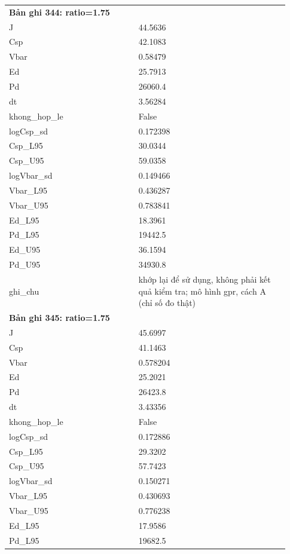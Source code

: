 \begin{longtable}{p{0.43\linewidth}p{0.50\linewidth}}
\midrule
\multicolumn{2}{p{0.95\linewidth}}{\textbf{Bản ghi 344: ratio=1.75}} \\
J & 44.5636 \\
Csp & 42.1083 \\
Vbar & 0.58479 \\
Ed & 25.7913 \\
Pd & 26060.4 \\
dt & 3.56284 \\
khong\_\allowbreak hop\_\allowbreak le & False \\
logCsp\_\allowbreak sd & 0.172398 \\
Csp\_\allowbreak L95 & 30.0344 \\
Csp\_\allowbreak U95 & 59.0358 \\
logVbar\_\allowbreak sd & 0.149466 \\
Vbar\_\allowbreak L95 & 0.436287 \\
Vbar\_\allowbreak U95 & 0.783841 \\
Ed\_\allowbreak L95 & 18.3961 \\
Pd\_\allowbreak L95 & 19442.5 \\
Ed\_\allowbreak U95 & 36.1594 \\
Pd\_\allowbreak U95 & 34930.8 \\
ghi\_\allowbreak chu & khớp lại để sử dụng, không phải kết quả kiểm tra; mô hình gpr, cách A (chỉ số đo thật) \\
\midrule
\multicolumn{2}{p{0.95\linewidth}}{\textbf{Bản ghi 345: ratio=1.75}} \\
J & 45.6997 \\
Csp & 41.1463 \\
Vbar & 0.578204 \\
Ed & 25.2021 \\
Pd & 26423.8 \\
dt & 3.43356 \\
khong\_\allowbreak hop\_\allowbreak le & False \\
logCsp\_\allowbreak sd & 0.172886 \\
Csp\_\allowbreak L95 & 29.3202 \\
Csp\_\allowbreak U95 & 57.7423 \\
logVbar\_\allowbreak sd & 0.150271 \\
Vbar\_\allowbreak L95 & 0.430693 \\
Vbar\_\allowbreak U95 & 0.776238 \\
Ed\_\allowbreak L95 & 17.9586 \\
Pd\_\allowbreak L95 & 19682.5 \\

\end{longtable}
